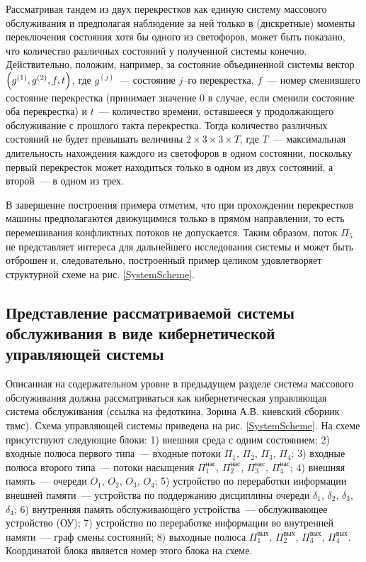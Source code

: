 \documentclass[a4paper,12pt,russian]{extarticle}
\begin{document}
Рассматривая тандем из двух перекрестков как единую систему массового обслуживания и предполагая наблюдение за ней только в (дискретные) моменты переключения состояния хотя бы одного из светофоров, может быть показано, что количество различных состояний у полученной системы конечно. Действительно, положим, например, за состояние объединенной системы вектор $\left(g^{(1)},g^{(2)}, f, t\right)$, где $g^{(j)}$~--- состояние $j$--го перекрестка, $f$~--- номер сменившего состояние перекрестка (принимает значение $0$ в случае, если сменили состояние оба перекрестка) и $t$~--- количество времени, оставшееся у продолжающего обслуживание с прошлого такта перекрестка. Тогда количество различных состояний не будет превышать величины  $2\times 3 \times 3 \times T$, где $T$~--- максимальная длительность нахождения каждого из светофоров в одном состоянии, поскольку первый перекресток может находиться только в одном из двух состояний, а второй~--- в одном из трех.

В завершение построения примера отметим, что при прохождении перекрестков машины предполагаются движущимися только в прямом направлении, то есть перемешивания конфликтных потоков не допускается. Таким образом, поток $\Pi_5$ не представляет интереса для дальнейшего исследования системы и может быть отброшен и, следовательно, построенный пример целиком удовлетворяет структурной схеме на рис. \ref{SystemScheme}.
 
\subsection{Представление рассматриваемой системы обслуживания в виде кибернетической управляющей системы}
Описанная на содержательном уровне в предыдущем разделе система массового обслуживания должна рассматриваться как кибернетическая управляющая система обслуживания (ссылка на федоткина, Зорина А.В. киевский сборник твмс). Схема управляющей системы приведена на рис. \ref{SystemScheme}. На схеме присутствуют следующие блоки: 1) внешняя среда с одним состоянием; 2) входные полюса первого типа~--- входные потоки $\Pi_1$, $\Pi_2$, $\Pi_3$, $\Pi_4$; 3) входные полюса второго типа~--- потоки насыщения $\Pi_1^{\mathrm{\text{нас}}}$, $\Pi_2^{\mathrm{\text{нас}}}$, $\Pi_3^{\mathrm{\text{нас}}}$, $\Pi_4^{\mathrm{\text{нас}}}$; 4) внешняя память~--- очереди $O_1$, $O_2$, $O_3$, $O_4$; 5) устройство по переработки информации внешней памяти~--- устройства по поддержанию дисциплины очереди $\delta_1$, $\delta_2$, $\delta_3$, $\delta_4$; 6) внутренняя память обслуживающего устройства~--- обслуживающее устройство (ОУ); 7) устройство по переработке информации во внутренней памяти~--- граф смены состояний; 8) выходные полюса $\Pi_1^{\mathrm{\text{вых}}}$, $\Pi_2^{\mathrm{\text{вых}}}$, $\Pi_3^{\mathrm{\text{вых}}}$, $\Pi_4^{\mathrm{\text{вых}}}$. Координатой блока является номер этого блока на схеме. 
\end{document}
